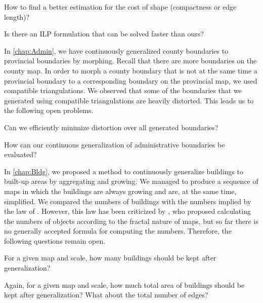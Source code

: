 \begin{open}
How to find a better estimation for the cost of shape 
(compactness or edge length)?
\end{open} 

\begin{open}
  Is there an ILP formulation that can be solved faster than ours?
\end{open}

In \chap\ref{chap:Admin}, we have continuously generalized county 
boundaries to provincial boundaries by morphing.
Recall that there are more boundaries on the county map.
In order to morph a county boundary that is not at the same time a
provincial boundary to a corresponding boundary on the provincial map,
we used compatible triangulations.
We observed that some of the boundaries that we generated using
compatible triangulations are heavily
distorted.  This leads us to the following open problems.

\begin{open}
  Can we efficiently minimize distortion over all generated boundaries?
\end{open} 

\begin{open}
  How can our continuous generalization of administrative boundaries
  be evaluated?
\end{open}

In \chap\ref{chap:Bldg}, we proposed a method to continuously 
generalize buildings to built-up areas
by aggregating and growing.
We managed to produce a sequence of maps 
in which the buildings are always growing and are, at the same time, 
simplified.
We compared the numbers of buildings with the numbers implied 
by the law of \textcite{Topfer1966}.
However, this law has been criticized by \textcite{Jiang2015Fractal},
who proposed calculating the numbers of objects
according to the fractal nature of maps,
but so far there is no generally accepted formula for computing the
numbers.  Therefore, the following questions remain open.

\begin{open}
  For a given map and scale, how many buildings should be kept after
  generalization?
\end{open}

\begin{open}
  Again, for a given map and scale, how much total area of buildings
  should be kept after generalization? What about the total number of
  edges?
\end{open}

